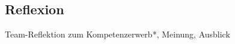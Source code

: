 \documentclass[../../main.tex]{subfiles} %
\begin{document}

\subsection{Reflexion}

Team-Reflektion zum Kompetenzerwerb*, Meinung, Ausblick
\end{document}
